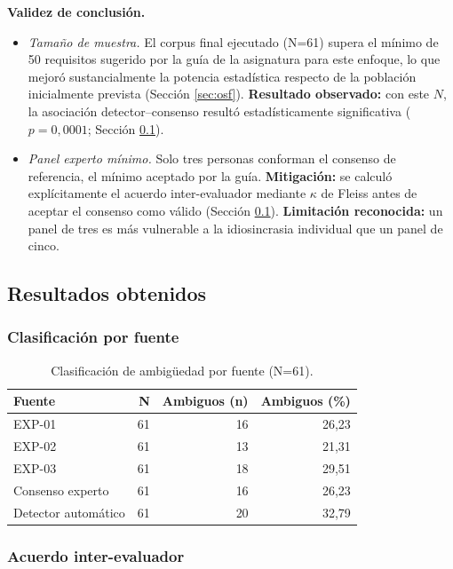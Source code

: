 \documentclass[journal,onecolumn]{IEEEtran}
\begin{document}
\textbf{Validez de conclusión.}
\begin{itemize}[leftmargin=*]
	\item \emph{Tamaño de muestra.} El corpus final ejecutado (N=61)
	supera el mínimo de 50 requisitos sugerido por la guía de la
	asignatura para este enfoque, lo que mejoró sustancialmente la
	potencia estadística respecto de la población inicialmente prevista
	(Sección \ref{sec:osf}). \textbf{Resultado observado:} con este $N$,
	la asociación detector--consenso resultó estadísticamente
	significativa ($p=0{,}0001$; Sección \ref{sec:resultados}).
	\item \emph{Panel experto mínimo.} Solo tres personas conforman el
	consenso de referencia, el mínimo aceptado por la guía. \textbf{Mitigación:}
	se calculó explícitamente el acuerdo inter-evaluador mediante $\kappa$
	de Fleiss antes de aceptar el consenso como válido (Sección
	\ref{sec:resultados}). \textbf{Limitación reconocida:} un panel de
	tres es más vulnerable a la idiosincrasia individual que un panel de
	cinco.
\end{itemize}

\subsection{Resultados obtenidos}
\label{sec:resultados}

\subsubsection{Clasificación por fuente}

\begin{table}[H]
	\centering
	\caption{Clasificación de ambigüedad por fuente (N=61).}
	\label{tab:clasificacion-fuente}
	\begin{tabular}{@{}lrrr@{}}
		\toprule
		\textbf{Fuente} & \textbf{N} & \textbf{Ambiguos (n)} & \textbf{Ambiguos (\%)} \\
		\midrule
		EXP-01 & 61 & 16 & 26,23 \\
		EXP-02 & 61 & 13 & 21,31 \\
		EXP-03 & 61 & 18 & 29,51 \\
		Consenso experto & 61 & 16 & 26,23 \\
		Detector automático & 61 & 20 & 32,79 \\
		\bottomrule
	\end{tabular}
\end{table}

\subsubsection{Acuerdo inter-evaluador}
\end{document}
